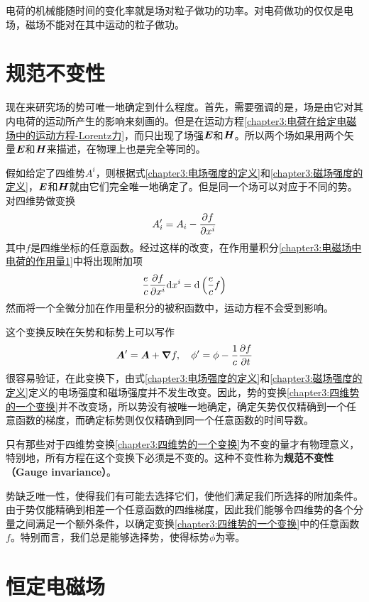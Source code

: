 电荷的机械能随时间的变化率就是场对粒子做功的功率。对电荷做功的仅仅是电场，磁场不能对在其中运动的粒子做功。

\section{规范不变性}

现在来研究场的势可唯一地确定到什么程度。首先，需要强调的是，场是由它对其内电荷的运动所产生的影响来刻画的。但是在运动方程\eqref{chapter3:电荷在给定电磁场中的运动方程-Lorentz力}，而只出现了场强$\boldsymbol{E}$和$\boldsymbol{H}$。所以两个场如果用两个矢量$\boldsymbol{E}$和$\boldsymbol{H}$来描述，在物理上也是完全等同的。

假如给定了四维势$A^i$，则根据式\eqref{chapter3:电场强度的定义}和\eqref{chapter3:磁场强度的定义}，$\boldsymbol{E}$和$\boldsymbol{H}$就由它们完全唯一地确定了。但是同一个场可以对应于不同的势。对四维势做变换
\begin{equation}
	A'_i = A_i-\frac{\partial f}{\partial x^i}
	\label{chapter3:四维势的一个变换}
\end{equation}
其中$f$是四维坐标的任意函数。经过这样的改变，在作用量积分\eqref{chapter3:电磁场中电荷的作用量1}中将出现附加项
\begin{equation}
	\dfrac{e}{c}\frac{\partial f}{\partial x^i}\mathrm{d} x^i = \mathrm{d} \left(\dfrac{e}{c}f\right)
\end{equation}
然而将一个全微分加在作用量积分的被积函数中，运动方程不会受到影响。

这个变换反映在矢势和标势上可以写作
\begin{equation}
	\boldsymbol{A}'=\boldsymbol{A} + \boldsymbol{\nabla} f,\quad \phi' = \phi-\frac1c\frac{\partial f}{\partial t}
\end{equation}
很容易验证，在此变换下，由式\eqref{chapter3:电场强度的定义}和\eqref{chapter3:磁场强度的定义}定义的电场强度和磁场强度并不发生改变。因此，势的变换\eqref{chapter3:四维势的一个变换}并不改变场，所以势没有被唯一地确定，确定矢势仅仅精确到一个任意函数的梯度，而确定标势则仅仅精确到同一个任意函数的时间导数。

只有那些对于四维势变换\eqref{chapter3:四维势的一个变换}为不变的量才有物理意义，特别地，所有方程在这个变换下必须是不变的。这种不变性称为{\bf 规范不变性（Gauge invariance）}。

势缺乏唯一性，使得我们有可能去选择它们，使他们满足我们所选择的附加条件。由于势仅能精确到相差一个任意函数的四维梯度，因此我们能够令四维势的各个分量之间满足一个额外条件，以确定变换\eqref{chapter3:四维势的一个变换}中的任意函数$f$。特别而言，我们总是能够选择势，使得标势$\phi$为零。

\section{恒定电磁场}

